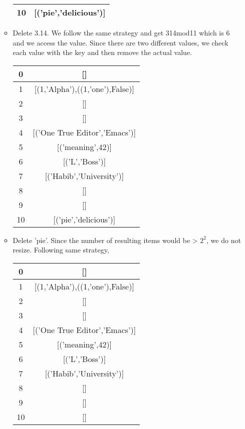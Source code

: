 \documentclass{article}
\begin{document}
\begin{enumerate}
\begin{itemize}
\begin{center}
\begin{tabular}{ |c|c| }
					\hline
					10&[('pie','delicious')]\\
					\hline
				\end{tabular}
			\end{center}
		\item Delete 3.14. We follow the same strategy and get 314mod11 which is 6 and we access the value. Since there are two different values, we check each value with the key and then remove the actual value.	
		\begin{center}
			\begin{tabular}{ |c|c| } 
				\hline
				0 & []   \\ 
				\hline
				1 &	[(1,'Alpha'),((1,'one'),False)] \\
				\hline 
				2 & []  \\ 
				\hline
				3&[]\\
				\hline
				4&[('One True Editor','Emacs')]\\
				\hline
				5&[('meaning',42)]\\
				\hline
				6&[('L','Boss')]\\
				\hline
				7&[('Habib','University')]\\
				\hline
				8&[]\\
				\hline
				9&[]\\
				\hline
				10&[('pie','delicious')]\\
				\hline
			\end{tabular}
		\end{center}
	\item Delete 'pie'. Since the number of resulting items would be > $2^2$, we do not resize. Following same strategy,
	\begin{center}
		\begin{tabular}{ |c|c| } 
			\hline
			0 & []   \\ 
			\hline
			1 &	[(1,'Alpha'),((1,'one'),False)] \\
			\hline 
			2 & []  \\ 
			\hline
			3&[]\\
			\hline
			4&[('One True Editor','Emacs')]\\
			\hline
			5&[('meaning',42)]\\
			\hline
			6&[('L','Boss')]\\
			\hline
			7&[('Habib','University')]\\
			\hline
			8&[]\\
			\hline
			9&[]\\
			\hline
			10&[]\\
			\hline

\end{tabular}
\end{center}
\end{itemize}
\end{enumerate}
\end{document}
